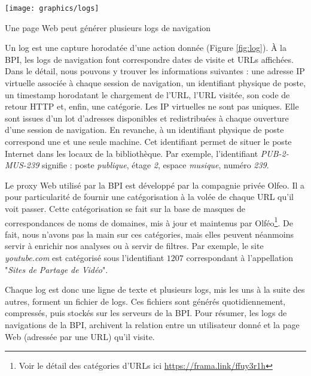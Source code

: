 \documentclass[symmetric,justified,marginals=raggedouter]{tufte-book}
\begin{document}
\begin{marginfigure}%
  \texttt{[image: graphics/logs]}
  \vspace*{0.2cm}  
  \caption{Une page Web peut générer plusieurs logs de navigation}
  \label{fig:logs}
\end{marginfigure} 

Un log est une capture horodatée d'une action donnée (Figure \ref{fig:log}). À la BPI, les logs de navigation font correspondre dates de visite et URLs affichées. Dans le détail, nous pouvons y trouver les informations suivantes : une adresse IP virtuelle associée à chaque session de navigation, un identifiant physique de poste, un timestamp horodatant le chargement de l'URL, l'URL visitée, son code de retour HTTP et, enfin, une catégorie. Les IP virtuelles ne sont pas uniques. Elle sont issues d'un lot d'adresses disponibles et redistribuées à chaque ouverture d'une session de navigation. En revanche, à un identifiant physique de poste correspond une et une seule machine. Cet identifiant permet de situer le poste Internet dans les locaux de la bibliothèque. Par exemple, l'identifiant \textit{PUB-2-MUS-239} signifie : poste \textit{publique}, étage \textit{2}, espace \textit{musique}, numéro \textit{239}.  

Le proxy Web utilisé par la BPI est développé par la compagnie privée Olfeo. Il a pour particularité de fournir une catégorisation à la volée de chaque URL qu'il voit passer. Cette catégorisation se fait sur la base de masques de correspondances de noms de domaines, mis à jour et maintenus par Olféo\footnote{Voir le détail des catégories d'URLs ici \url{https://frama.link/ffuy3r1h}}. De fait, nous n'avons pas la main sur ces catégories, mais elles peuvent néanmoins servir à enrichir nos analyses ou à servir de filtres. Par exemple, le site \textit{youtube.com} est catégorisé sous l'identifiant $1207$ correspondant à l'appellation "\textit{Sites de Partage de Vidéo}".

Chaque log est donc une ligne de texte et plusieurs logs, mis les uns à la suite des autres, forment un fichier de logs. Ces fichiers sont générés quotidiennement, compressés, puis stockés sur les serveurs de la BPI. Pour résumer, les logs de navigations de la BPI, archivent la relation entre un utilisateur donné et la page Web (adressée par une URL) qu'il visite. \\
\end{document}
